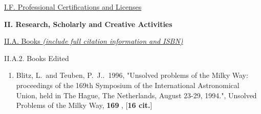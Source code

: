 \documentclass[11pt,letterpaper]{article}
\begin{document}
\underline{I.F. Professional Certifications and Licenses}


\textbf{II. Research, Scholarly and Creative Activities}

% 

\noindent\underline{II.A. Books \textit{(include full citation information and ISBN)}}


II.A.2. Books Edited

\begin{enumerate}[resume,label=\textbf{\arabic*}.]


\item  
Blitz, L.~and Teuben, P.~J..\  1996,  "Unsolved problems of the Milky Way: 
proceedings of the 169th Symposium of the International Astronomical Union, 
held in The Hague, The Netherlands, August 23-29, 1994.", Unsolved Problems 
of the Milky Way,  {\bf 169} ,  [{\bf 16 cit.}] 


\end{enumerate}
\end{document}

